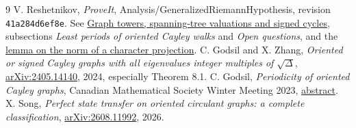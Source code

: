 \documentclass[11pt,letterpaper]{article}
\begin{document}
\begin{thebibliography}{9}
 V. Reshetnikov, \emph{ProveIt}, Analysis/GeneralizedRiemannHypothesis, revision \texttt{41a284d6ef8e}. See
\href{https://github.com/VladimirReshetnikov/ProveIt/blob/41a284d6ef8eb16d783bfc685ab99cc6e1d28daa/Analysis/GeneralizedRiemannHypothesis/Article/sections/gra.tex}{Graph towers, spanning-tree valuations and signed cycles}, subsections \emph{Least periods of oriented Cayley walks} and \emph{Open questions}, and the
\href{https://github.com/VladimirReshetnikov/ProveIt/blob/41a284d6ef8eb16d783bfc685ab99cc6e1d28daa/Analysis/GeneralizedRiemannHypothesis/Article/sections/li.tex}{lemma on the norm of a character projection}.
 C. Godsil and X. Zhang, \emph{Oriented or signed Cayley graphs with all eigenvalues integer multiples of $\sqrt\Delta$}, \href{https://arxiv.org/abs/2405.14140}{arXiv:2405.14140}, 2024, especially Theorem 8.1.
 C. Godsil, \emph{Periodicity of oriented Cayley graphs}, Canadian Mathematical Society Winter Meeting 2023, \href{https://www2.cms.math.ca/Reunions/hiver23/res/pdf/ctm-cg.pdf}{abstract}.
 X. Song, \emph{Perfect state transfer on oriented circulant graphs: a complete classification}, \href{https://arxiv.org/abs/2608.11992}{arXiv:2608.11992}, 2026.
\end{thebibliography}
\end{document}

